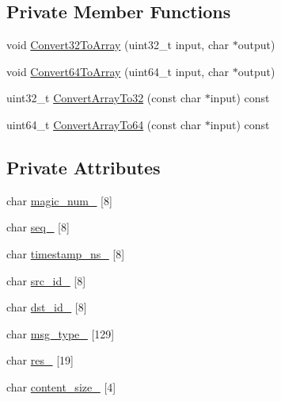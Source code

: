 \subsection*{Private Member Functions}
\begin{DoxyCompactItemize}
\item 
void \hyperlink{classapollo_1_1cyber_1_1message_1_1MessageHeader_a0f8e768da0eec41c2ef70ef244b14189}{Convert32\-To\-Array} (uint32\-\_\-t input, char $\ast$output)
\item 
void \hyperlink{classapollo_1_1cyber_1_1message_1_1MessageHeader_a77631867b6c7ff3698d44907de62be34}{Convert64\-To\-Array} (uint64\-\_\-t input, char $\ast$output)
\item 
uint32\-\_\-t \hyperlink{classapollo_1_1cyber_1_1message_1_1MessageHeader_a63db25f71935953b15a5d65df7c30d4c}{Convert\-Array\-To32} (const char $\ast$input) const 
\item 
uint64\-\_\-t \hyperlink{classapollo_1_1cyber_1_1message_1_1MessageHeader_a5b565be0fce8b33be14fbc76bc496ade}{Convert\-Array\-To64} (const char $\ast$input) const 
\end{DoxyCompactItemize}
\subsection*{Private Attributes}
\begin{DoxyCompactItemize}
\item 
char \hyperlink{classapollo_1_1cyber_1_1message_1_1MessageHeader_a5ee4416632bf689c13579b0624431f22}{magic\-\_\-num\-\_\-} \mbox{[}8\mbox{]}
\item 
char \hyperlink{classapollo_1_1cyber_1_1message_1_1MessageHeader_a7e62e4bc94904b3fc2ceb14a5d98148b}{seq\-\_\-} \mbox{[}8\mbox{]}
\item 
char \hyperlink{classapollo_1_1cyber_1_1message_1_1MessageHeader_a160761ee05fb6fa0bb24d09a0ab8ce25}{timestamp\-\_\-ns\-\_\-} \mbox{[}8\mbox{]}
\item 
char \hyperlink{classapollo_1_1cyber_1_1message_1_1MessageHeader_ac3936e44b33a484870cee43906ebf2ff}{src\-\_\-id\-\_\-} \mbox{[}8\mbox{]}
\item 
char \hyperlink{classapollo_1_1cyber_1_1message_1_1MessageHeader_aea5539f8d9b9ed79aa443cc223b7fa9c}{dst\-\_\-id\-\_\-} \mbox{[}8\mbox{]}
\item 
char \hyperlink{classapollo_1_1cyber_1_1message_1_1MessageHeader_a41f07c196c177be3ea78423d8d8dd61e}{msg\-\_\-type\-\_\-} \mbox{[}129\mbox{]}
\item 
char \hyperlink{classapollo_1_1cyber_1_1message_1_1MessageHeader_ad518443800c31bd4a7cdec97d63c1985}{res\-\_\-} \mbox{[}19\mbox{]}
\item 
char \hyperlink{classapollo_1_1cyber_1_1message_1_1MessageHeader_a70d07ea16aa774b404f8c10686548152}{content\-\_\-size\-\_\-} \mbox{[}4\mbox{]}
\end{DoxyCompactItemize}


